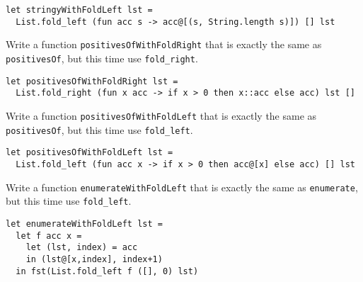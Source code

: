 \documentclass[addpoints]{exam}
\begin{document}
\begin{questions}
  \begin{solutionbox}{2cm}
    \begin{verbatim}
let stringyWithFoldLeft lst =
  List.fold_left (fun acc s -> acc@[(s, String.length s)]) [] lst
    \end{verbatim}
  \end{solutionbox}

  
  \question 
  Write a function \texttt{positivesOfWithFoldRight}
  that is exactly the same as \texttt{positivesOf},
  but this time use \texttt{fold\_right}.

  \begin{solutionbox}{2cm}
    \begin{verbatim}
let positivesOfWithFoldRight lst =
  List.fold_right (fun x acc -> if x > 0 then x::acc else acc) lst []
    \end{verbatim}
  \end{solutionbox}

  
  \question 
  Write a function \texttt{positivesOfWithFoldLeft}
  that is exactly the same as \texttt{positivesOf},
  but this time use \texttt{fold\_left}.

  \begin{solutionbox}{2cm}
    \begin{verbatim}
let positivesOfWithFoldLeft lst =
  List.fold_left (fun acc x -> if x > 0 then acc@[x] else acc) [] lst
    \end{verbatim}
  \end{solutionbox}

  
  \question 
  Write a function \texttt{enumerateWithFoldLeft}
  that is exactly the same as \texttt{enumerate},
  but this time use \texttt{fold\_left}.

  \begin{solutionbox}{3.5cm}
    \begin{verbatim}
let enumerateWithFoldLeft lst =
  let f acc x =
    let (lst, index) = acc
    in (lst@[x,index], index+1)
  in fst(List.fold_left f ([], 0) lst)         
    \end{verbatim}
  \end{solutionbox}

  
  \vspace{1em}
  \vspace{1em}


\end{questions}
\end{document}
